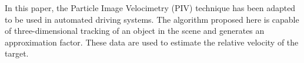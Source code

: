 In this paper, the Particle Image Velocimetry (PIV) technique has been adapted to be used in automated driving systems.
The algorithm proposed here is capable of three-dimensional tracking of an object in the scene and generates an approximation factor.
These data are used to estimate the relative velocity of the target.
